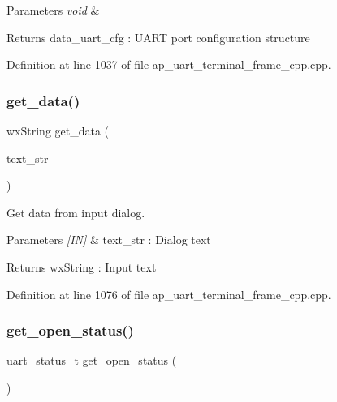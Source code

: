 \begin{DoxyParams}{Parameters}
{\em void} & \\
\hline
\end{DoxyParams}
\begin{DoxyReturn}{Returns}
data\+\_\+uart\+\_\+cfg \+: U\+A\+RT port configuration structure 
\end{DoxyReturn}


Definition at line 1037 of file ap\+\_\+uart\+\_\+terminal\+\_\+frame\+\_\+cpp.\+cpp.

\mbox{\label{group___u_a_r_t__terminal_gaa87c4c777f73c1b5d39793e6a75e26d6}} 
\subsubsection{get\_data()}
{\footnotesize\ttfamily wx\+String get\+\_\+data (\begin{DoxyParamCaption}\item[{wx\+String}]{text\+\_\+str }\end{DoxyParamCaption})}



Get data from input dialog. 


\begin{DoxyParams}{Parameters}
{\em \mbox{[}\+I\+N\mbox{]}} & text\+\_\+str \+: Dialog text \\
\hline
\end{DoxyParams}
\begin{DoxyReturn}{Returns}
wx\+String \+: Input text 
\end{DoxyReturn}


Definition at line 1076 of file ap\+\_\+uart\+\_\+terminal\+\_\+frame\+\_\+cpp.\+cpp.

\mbox{\label{group___u_a_r_t__terminal_ga4290ac6ba3f3672d077625fbd079dd9f}} 
\subsubsection{get\_open\_status()}
{\footnotesize\ttfamily uart\+\_\+status\+\_\+t get\+\_\+open\+\_\+status (\begin{DoxyParamCaption}\item[{void}]{ }\end{DoxyParamCaption})}




